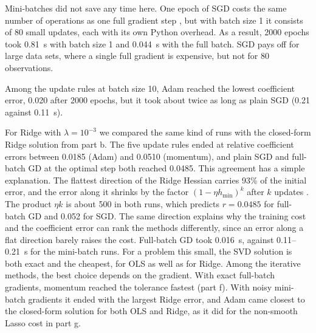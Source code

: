 \documentclass[aps,prb,reprint,superscriptaddress,nofootinbib,longbibliography,floatfix]{revtex4-2}
\begin{document}
Mini-batches did not save any time here. One epoch of SGD costs the same number of operations as one full gradient step \cite[Eq.~(4.38)]{HjorthJensen2026}, but with batch size 1 it consists of 80 small updates, each with its own Python overhead. As a result, 2000 epochs took 0.81~s with batch size 1 and 0.044~s with the full batch. SGD pays off for large data sets, where a single full gradient is expensive, but not for 80 observations.

Among the update rules at batch size 10, Adam reached the lowest coefficient error, 0.020 after 2000 epochs, but it took about twice as long as plain SGD (0.21 against 0.11~s).

For Ridge with $\lambda=10^{-3}$ we compared the same kind of runs with the closed-form Ridge solution from part b. The five update rules ended at relative coefficient errors between 0.0185 (Adam) and 0.0510 (momentum), and plain SGD and full-batch GD at the optimal step both reached 0.0485. This agreement has a simple explanation. The flattest direction of the Ridge Hessian carries 93\% of the initial error, and the error along it shrinks by the factor $(1-\eta h_{\min})^k$ after $k$ updates \cite[Eq.~(4.19)]{HjorthJensen2026}. The product $\eta k$ is about 500 in both runs, which predicts $r=0.0485$ for full-batch GD and 0.052 for SGD. The same direction explains why the training cost and the coefficient error can rank the methods differently, since an error along a flat direction barely raises the cost. Full-batch GD took 0.016~s, against 0.11--0.21~s for the mini-batch runs. For a problem this small, the SVD solution is both exact and the cheapest, for OLS as well as for Ridge. Among the iterative methods, the best choice depends on the gradient. With exact full-batch gradients, momentum reached the tolerance fastest (part f). With noisy mini-batch gradients it ended with the largest Ridge error, and Adam came closest to the closed-form solution for both OLS and Ridge, as it did for the non-smooth Lasso cost in part g.
\end{document}
